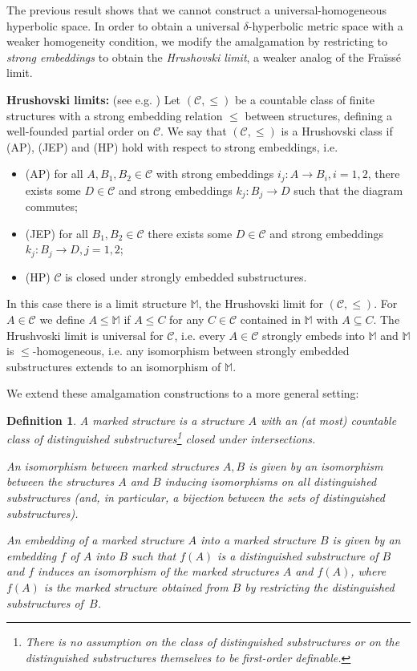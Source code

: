 \documentclass{amsart}
\renewcommand{\d}{\delta}
\newcommand{\C}{\mathcal{C}}
\newtheorem{definition}[defi]{Definition}
\begin{document}
The previous result shows that we cannot construct a universal-homogeneous hyperbolic space.
In order to obtain a universal $\d$-hyperbolic metric space with a weaker homogeneity condition, we modify the amalgamation by restricting to \emph{strong embeddings} to obtain the \emph{Hrushovski limit}, a weaker analog of the Fra\"iss\'e limit.

\medskip\noindent
{\bf{Hrushovski limits:}}  (see e.g. \cite{Hr})  Let $(\mathcal{C},\leq)$ be a countable class of finite structures with a strong embedding relation $\leq$ between structures, defining a well-founded partial order on $\mathcal{C}$. We say that $(\C,\leq)$ is a Hrushovski class if (AP), (JEP) and (HP) hold with respect to strong embeddings, i.e.
\begin{itemize}
\item (AP) for all $A, B_1, B_2\in\mathcal{C}$ with strong embeddings $i_j:A\longrightarrow B_i, i=1,2$, there exists some $D\in\mathcal{C}$ and strong embeddings $k_j:B_j\longrightarrow D$ such that the diagram commutes;
\item (JEP) for all $B_1, B_2\in\mathcal{C}$ there exists some $D\in\mathcal{C}$ and strong embeddings $k_j:B_j\longrightarrow D, j=1,2$;
\item (HP) $\C$ is closed under strongly embedded substructures.
\end{itemize}
 In this case there is a limit structure $\mathbb{M}$, the Hrushovski limit for  $(\mathcal{C},\leq)$. For $A\in\mathcal{C}$ we define $A\leq \mathbb{M}$ if $A\leq C$ for any $C\in\mathcal{C}$ contained in $\mathbb{M}$ with $A\subseteq C$. The Hrushvoski limit is universal for $\mathcal{C}$, i.e. every $A\in\mathcal{C}$ strongly embeds into $\mathbb{M}$ and $\mathbb{M}$ is $\leq$-homogeneous, i.e. any isomorphism between strongly embedded substructures extends to an isomorphism of $\mathbb{M}$. 



We extend these amalgamation constructions to a more general setting:


\begin{definition}\label{def:marked structure}
A \emph{marked structure} is a structure $A$ with an (at most) countable class of distinguished substructures\footnote{There is no assumption on the class of distinguished substructures or on the distinguished substructures themselves to be first-order definable. } closed under intersections.


An \emph{isomorphism} between marked structures $A, B$ is given by an isomorphism between the structures $A$ and $B$ inducing isomorphisms on all distinguished substructures (and, in particular, a bijection between the sets of distinguished substructures).

An \emph{embedding} of a marked structure $A$ into a marked structure $B$ is given by an embedding $f$ of $A$ into $B$  such that $f(A)$ is a distinguished substructure of $B$ and $f$ induces an isomorphism of the marked structures $A$ and $f(A)$, where $f(A)$ is the marked structure obtained from $B$ by restricting the distinguished substructures of~$B$.

\end{definition}
\end{document}
